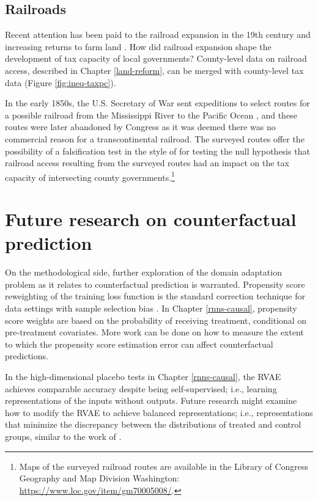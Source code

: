 \subsection{Railroads} Recent attention has been paid to the railroad expansion in the 19th century and increasing returns to farm land  \citep{donaldson2016railroads}. How did railroad expansion shape the development of tax capacity of local governments? County-level data on railroad access, described in Chapter \ref{land-reform}, can be merged with county-level tax data (Figure \ref{fig:ineq-taxpc}). 

In the early 1850s, the U.S. Secretary of War sent expeditions to select routes for a possible railroad from the Mississippi River to the Pacific Ocean \citep{blake1857geological,baird1858reports}, and these routes were later abandoned by Congress as it was deemed there was no commercial reason for a transcontinental railroad. The surveyed routes offer the possibility of a falsification test in the style of \citep{donaldson2018railroads} for testing the null hypothesis that railroad access resulting from the surveyed routes had an impact on the tax capacity of intersecting county governments.\footnote{Maps of the surveyed railroad routes are available in the Library of Congress Geography and Map Division Washington: \url{https://www.loc.gov/item/gm70005008/}.}

\section{Future research on counterfactual prediction}

On the methodological side, further exploration of the domain adaptation problem as it relates to counterfactual prediction is warranted. Propensity score reweighting of the training loss function is the standard correction technique for data settings with sample selection bias \citep{cortes2008sample}. In Chapter \ref{rnns-causal}, propensity score weights are based on the probability of receiving treatment, conditional on pre-treatment covariates. More work can be done on how to measure the extent to which the propensity score estimation error can affect counterfactual predictions. 

In the high-dimensional placebo tests in Chapter \ref{rnns-causal}, the RVAE achieves comparable accuracy despite being self-supervised; i.e., learning representations of the inputs without outputs. Future research might examine how to modify the RVAE to achieve balanced representations; i.e., representations that minimize the discrepancy between the distributions of treated and control groups, similar to the work of \citet{johansson2016learning}.


